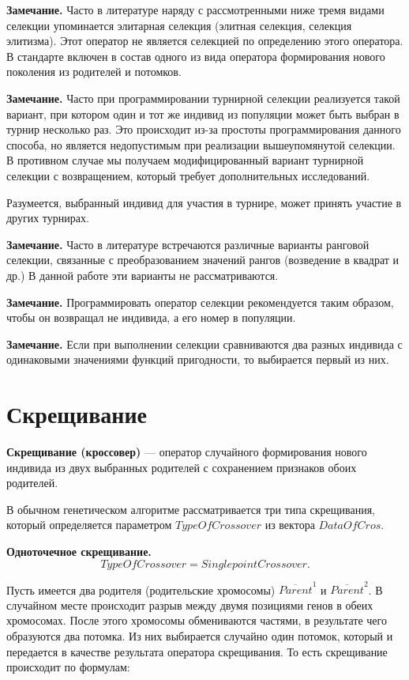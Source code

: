 \textbf{Замечание.} Часто в литературе наряду с рассмотренными ниже тремя видами селекции упоминается элитарная селекция (элитная селекция, селекция элитизма). Этот оператор не является селекцией по определению этого оператора. В стандарте включен в состав одного из вида оператора формирования нового поколения из родителей и потомков.

\textbf{Замечание.} Часто при программировании турнирной селекции реализуется такой вариант, при котором один и тот же индивид из популяции может быть выбран в турнир несколько раз. Это происходит из-за простоты программирования данного способа, но является недопустимым при реализации вышеупомянутой селекции. В противном случае мы получаем модифицированный вариант турнирной селекции с возвращением, который требует дополнительных исследований.

Разумеется, выбранный индивид для участия в турнире, может принять участие в других турнирах.

\textbf{Замечание.} Часто в литературе встречаются различные варианты ранговой селекции, связанные с преобразованием значений рангов (возведение в квадрат и др.) В данной работе эти варианты не рассматриваются.

\textbf{Замечание.} Программировать оператор селекции рекомендуется таким образом, чтобы он возвращал не индивида, а его номер в популяции.

\textbf{Замечание.} Если при выполнении селекции сравниваются два разных индивида с одинаковыми значениями функций пригодности, то выбирается первый из них.

\section{Скрещивание} \label{StandardGA:subsection_Crossover}

\textbf{Скрещивание (кроссовер)} --- оператор случайного формирования нового индивида из двух выбранных родителей с сохранением признаков обоих родителей.

В обычном генетическом алгоритме рассматривается три типа скрещивания, который определяется параметром $ TypeOfCrossover $ из вектора $ DataOfCros $.

\textbf{Одноточечное скрещивание.}
\begin{equation}
\label{StandardGA:eq:SinglepointCrossover}
TypeOfCrossover=SinglepointCrossover.
\end{equation}

Пусть имеется два родителя (родительские хромосомы) $ \overline{Parent}^1 $ и $ \overline{Parent}^2$. В случайном месте происходит разрыв между двумя позициями генов в обеих хромосомах. После этого хромосомы обмениваются частями, в результате чего образуются два потомка. Из них выбирается случайно один потомок, который и передается в качестве результата оператора скрещивания. То есть скрещивание происходит по формулам:

